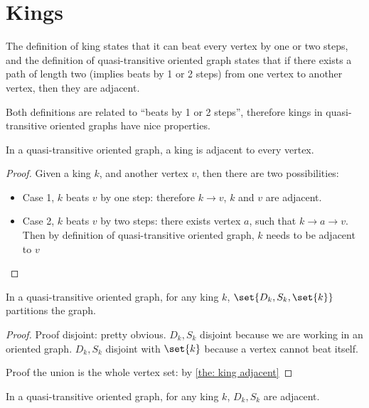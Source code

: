 \section{Kings}\label{sec: quasi-transitive king}

The definition of king states that it can beat every vertex
by one or two steps,
and the definition of quasi-transitive oriented graph states that
if there exists a path of length two (implies beats by 1 or 2 steps)
from one vertex to another vertex, then they are adjacent.

Both definitions are related to ``beats by 1 or 2 steps'',
therefore kings in quasi-transitive oriented graphs
have nice properties.

\begin{lemma}\label{the: king adjacent}
  In a quasi-transitive oriented graph,
  a king is adjacent to every vertex.
\end{lemma}

\begin{proof}
  Given a king \(k\), and another vertex \(v\),
  then there are two possibilities:
  \begin{itemize}
    \item
      Case 1, \(k\) beats \(v\) by one step:
      therefore \(k \to v\), \(k\) and \(v\) are adjacent.
    \item
      Case 2, \(k\) beats \(v\) by two steps:
      there exists vertex \(a\), such that \(k \to a \to v\).
      Then by definition of quasi-transitive oriented graph,
      \(k\) needs to be adjacent to \(v\)
  \end{itemize}
\end{proof}

\begin{lemma}\label{the: king partitions in quasi-transitive}
  In a quasi-transitive oriented graph,
  for any king \(k\), \(\set{D_k, S_k, \set{k}}\)
  partitions the graph.
\end{lemma}

\begin{proof}
  Proof disjoint: pretty obvious.
  \(D_k, S_k\) disjoint because we are working in an oriented graph.
  \(D_k, S_k\) disjoint with \(\set{k}\)
  because a vertex cannot beat itself.

  Proof the union is the whole vertex set:
  by \cref{the: king adjacent}
\end{proof}

\begin{lemma}\label{the: D S of king adjacent in quasi-transitive}
  In a quasi-transitive oriented graph,
  for any king \(k\), \(D_k, S_k\) are adjacent.
\end{lemma}

